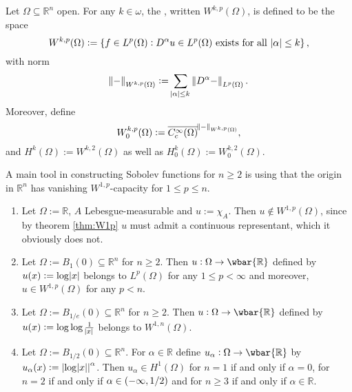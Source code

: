 \begin{definition}
	Let $\Omega \subseteq \mathbb{R}^n$ open. For any $k \in \omega$, the , written $W^{k,p}(\Omega)$, is defined to be the space
	\begin{equation*}
		W^{k,p}(\Omega) := \cbr[0]{f \in L^p(\Omega) : D^\alpha u \in L^p(\Omega) \text{ exists for all } \abs{\alpha} \leq k},
	\end{equation*}
	\noindent with norm
	\begin{equation*}
		\norm{-} _{W^{k,p}(\Omega)} := \sum_{\abs{\alpha} \leq k} \norm[0]{D^\alpha -}_{L^p(\Omega)}.
	\end{equation*}
	Moreover, define
	\begin{equation*}
		W^{k,p}_0(\Omega) := \overline{C^\infty_c(\Omega)}^{\norm{-}_{W^{k,p}(\Omega)}},
	\end{equation*}
	\noindent and $H^k(\Omega) := W^{k,2}(\Omega)$ as well as $H_0^k(\Omega) := W^{k,2}_0(\Omega)$.
\end{definition}

\begin{examples}
	A main tool in constructing Sobolev functions for $n \geq 2$ is using that the origin in $\mathbb{R}^n$ has vanishing $W^{1,p}$-capacity for $1 \leq p \leq n$.
	\begin{enumerate}[label = \textup{(}\alph*\textup{)},wide=0pt]
		\item Let $\Omega := \mathbb{R}$, $A$ Lebesgue-measurable and $u := \chi_A$. Then $u \notin W^{1,p}(\Omega)$, since by theorem \ref{thm:W1p} $u$ must admit a continuous representant, which it obviously does not.
		\item Let $\Omega := B_1(0) \subseteq \mathbb{R}^n$ for $n \geq 2$. Then $u : \Omega \to \wbar{\mathbb{R}}$ defined by $u(x) := \log\abs{x}$ belongs to $L^p(\Omega)$ for any $1 \leq p < \infty$ and moreover, $u \in W^{1,p}(\Omega)$ for any $p < n$.
		\item Let $\Omega := B_{1/e}(0) \subseteq \mathbb{R}^n$ for $n \geq 2$. Then $u : \Omega \to \wbar{\mathbb{R}}$ defined by $u(x) := \log\log\frac{1}{\abs{x}}$ belongs to $W^{1,n}(\Omega)$.
		\item Let $\Omega := B_{1/2}(0) \subseteq \mathbb{R}^n$. For $\alpha \in \mathbb{R}$ define $u_\alpha : \Omega \to \wbar{\mathbb{R}}$ by $u_\alpha(x) := \abs[0]{\log\abs{x}}^\alpha$. Then $u_\alpha \in H^1(\Omega)$ for $n = 1$ if and only if $\alpha = 0$, for $n = 2$ if and only if $\alpha \in \intoo[0]{-\infty,1/2}$ and for $n \geq 3$ if and only if $\alpha \in \mathbb{R}$.
	\end{enumerate}
\end{examples}

